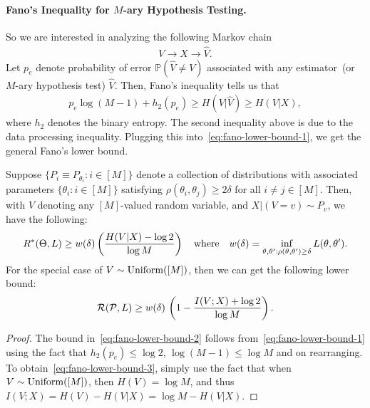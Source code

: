 \documentclass[12pt]{article}
\begin{document}
\paragraph{Fano's Inequality for $M$-ary Hypothesis Testing.} So we are interested in analyzing the following Markov chain 
\begin{align}
	V \longrightarrow X \longrightarrow \hat{V}. 
\end{align}
Let $p_e$ denote probability of error $\mathbb{P}(\hat{V} \neq V)$ associated with any estimator~(or $M$-ary hypothesis test) $\hat{V}$. Then, Fano's inequality tells us that 
\begin{align}
	p_e \log (M-1) + h_2(p_e) \geq H(V|\hat{V}) \geq H(V|X), 
\end{align}
where $h_2$ denotes the binary entropy. The second inequality above is due to the data processing inequality. Plugging this into~\eqref{eq:fano-lower-bound-1}, we get the general Fano's lower bound. 
\begin{theorem}
	\label{theorem:fano-main-1} Suppose $\{P_i \equiv P_{\theta_i}: i \in [M]\}$ denote a collection of distributions with associated parameters $\{\theta_i: i \in [M]\}$ satisfying $\rho(\theta_i, \theta_j) \geq 2\delta$ for all $i \neq j \in [M]$. Then, with $V$ denoting any $[M]$-valued random variable, and $X|(V=v) \sim P_v$, we have the following: 
	\begin{align}
		R^*(\Theta, L) \geq w(\delta) \left( \frac{H(V|X) - \log 2}{\log M} \right) \quad \text{where} \quad w(\delta) = \inf_{\theta, \theta': \rho(\theta, \theta') \geq \delta} L(\theta, \theta').  \label{eq:fano-lower-bound-2}
	\end{align}
	For the special case of $V \sim \mathrm{Uniform}([M])$, then we can get the following lower bound: 
	\begin{align}
		{\cal R}({\cal P}, L) \geq w(\delta)\, \left( 1 - \frac{I(V; X) + \log 2}{\log M} \right). \label{eq:fano-lower-bound-3}
	\end{align}
\end{theorem}
\begin{proof}
The bound in~\eqref{eq:fano-lower-bound-2} follows from~\eqref{eq:fano-lower-bound-1} using the fact that $h_2(p_e) \leq \log 2$, $\log(M-1) \leq \log M$ and on rearranging. To obtain~\eqref{eq:fano-lower-bound-3}, simply use the fact that when $V \sim \mathrm{Uniform}([M])$, then $H(V) = \log M$, and thus $I(V;X) = H(V) - H(V|X) = \log M - H(V|X)$. 
\end{proof}
\end{document}
